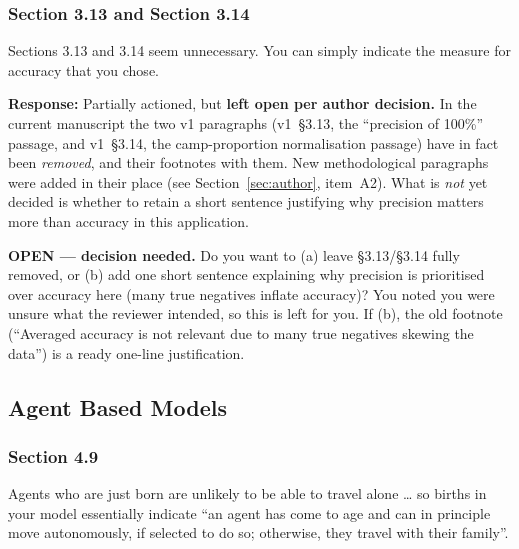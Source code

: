 \documentclass[11pt,a4paper]{article}
\begin{document}
\subsubsection*{Section 3.13 and Section 3.14}

\begin{reviewbox}
Sections 3.13 and 3.14 seem unnecessary. You can simply indicate the measure for accuracy that you chose.
\end{reviewbox}

\textbf{Response:} Partially actioned, but \textbf{left open per author decision.} In the current manuscript the
two v1 paragraphs (v1~\S3.13, the ``precision of 100\%'' passage, and v1~\S3.14, the camp-proportion
normalisation passage) have in fact been \emph{removed}, and their footnotes with them. New methodological
paragraphs were added in their place (see Section~\ref{sec:author}, item~A2). What is \emph{not} yet decided is
whether to retain a short sentence justifying why precision matters more than accuracy in this application.

\vspace{0.3cm}
\begin{flagbox}
\textbf{OPEN --- decision needed.} Do you want to (a) leave §3.13/§3.14 fully removed, or (b) add one short
sentence explaining why precision is prioritised over accuracy here (many true negatives inflate accuracy)?
You noted you were unsure what the reviewer intended, so this is left for you. If (b), the old footnote
(``Averaged accuracy is not relevant due to many true negatives skewing the data'') is a ready one-line
justification.
\end{flagbox}

\subsection*{Agent Based Models}

\subsubsection*{Section 4.9}

\begin{reviewbox}
Agents who are just born are unlikely to be able to travel alone \ldots{} so births in your model essentially indicate ``an agent has come to age and can in principle move autonomously, if selected to do so; otherwise, they travel with their family''.
\end{reviewbox}
\end{document}
